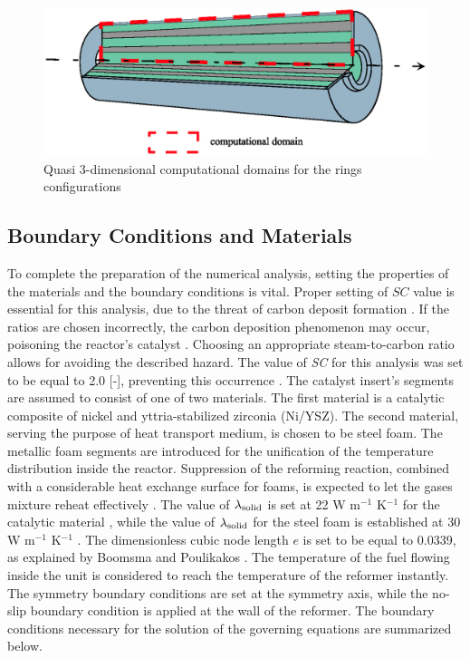 \documentclass[preprint,12pt]{elsarticle}
\begin{document}
\begin{figure}[h]
\centering
\includegraphics[width=120mm]{domain.eps}\hspace{2pc} 
\caption{\label{fig:comp_domain} Quasi 3-dimensional computational domains for the rings configurations}
\end{figure}

\subsection{Boundary Conditions and Materials}
\label{sec:boundary}

To complete the preparation of the numerical analysis, setting the properties of the materials and the boundary conditions is vital. Proper setting of $\textit{SC}$ value is essential for this analysis, due to the threat of carbon deposit formation \cite{Bartholomew1982}. If the ratios are chosen incorrectly, the carbon deposition phenomenon may occur, poisoning the reactor's catalyst \cite{Lakhapatri2009}. Choosing an appropriate steam-to-carbon ratio allows for avoiding the described hazard. The value of \textit{SC} for this analysis was set to be equal to 2.0 [-], preventing this occurrence \cite{Brus2015, Tomiczek2017}. The catalyst insert's segments are assumed to consist of one of two materials. The first material is a catalytic composite of nickel and yttria-stabilized zirconia (Ni/YSZ). The second material, serving the purpose of heat transport medium, is chosen to be steel foam. The metallic foam segments are introduced for the unification of the temperature distribution inside the reactor.  Suppression of the reforming reaction, combined with a considerable heat exchange surface for foams, is expected to let the gases mixture reheat effectively \cite{Zhao2012}. The value of $\lambda_{\rm{solid}}$ is set at 22 W m$^{-1}$ K$^{-1}$ for the catalytic material \cite{Kawashima1996}, while the value of $\lambda_{\rm{solid}}$ for the steel foam is established at 30 W m$^{-1}$ K$^{-1}$ \cite{Peet2011}. The dimensionless cubic node length $e$ is set to be equal to 0.0339, as explained by Boomsma and Poulikakos \cite{Boomsma2001}.  The temperature of the fuel flowing inside the unit is considered to reach the temperature of the reformer instantly. The symmetry boundary conditions are set at the symmetry axis, while the no-slip boundary condition is applied at the wall of the reformer. The boundary conditions necessary for the solution of the governing equations are summarized below.
\end{document}
